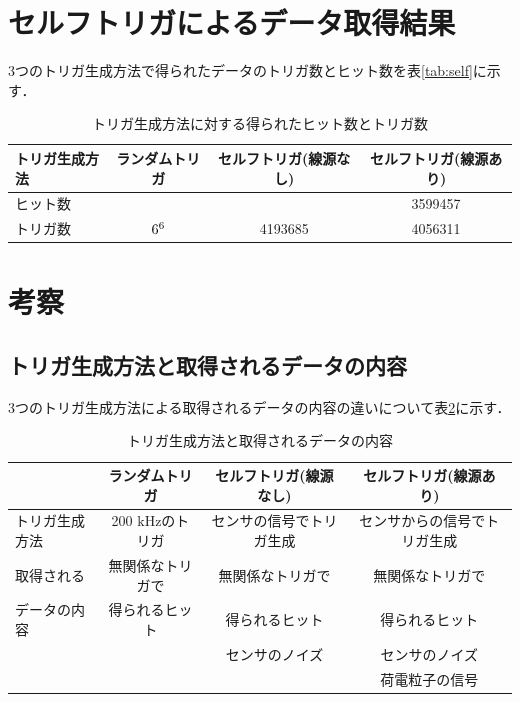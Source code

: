 \section{セルフトリガによるデータ取得結果}
\label{sec:selfconc}
3つのトリガ生成方法で得られたデータのトリガ数とヒット数を表\ref{tab:self}に示す．

\begin{table}[h]
  \centering
  \caption{トリガ生成方法に対する得られたヒット数とトリガ数}
  \begin{tabular} {l|ccc} \hline
    トリガ生成方法 & ランダムトリガ & セルフトリガ(線源なし) & セルフトリガ(線源あり) \\ \hline
    ヒット数 & & & 3599457 \\
    トリガ数 & $6 \time 10^6$ & 4193685 & 4056311 \\ \hline
  \end{tabular}
  \label{tab:selfpara}
\end{table}

\section{考察}

\subsection*{トリガ生成方法と取得されるデータの内容}
3つのトリガ生成方法による取得されるデータの内容の違いについて表\ref{tab:selfdata}に示す．

\begin{table}[h]
  \centering
  \caption{トリガ生成方法と取得されるデータの内容}
  \begin{tabular} {l|ccc} \hline
    & ランダムトリガ & セルフトリガ(線源なし) & セルフトリガ(線源あり) \\ \hline
    トリガ生成方法 & 200 $\mathrm{kHz}$のトリガ & センサの信号でトリガ生成 & センサからの信号でトリガ生成 \\ \hline
    取得される & 無関係なトリガで & 無関係なトリガで & 無関係なトリガで\\
    データの内容 & 得られるヒット & 得られるヒット & 得られるヒット \\
    & & センサのノイズ & センサのノイズ \\
    & & & 荷電粒子の信号\\ \hline
  \end{tabular}
  \label{tab:selfdata}
\end{table}

